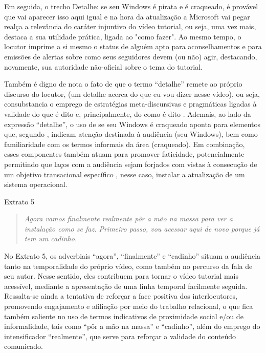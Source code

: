 \documentclass[portuguese]{textolivre}
\begin{document}
Em seguida, o trecho Detalhe: se seu Windows é pirata e é craqueado, é provável que vai aparecer isso aqui igual e na hora da atualização a Microsoft vai pegar realça a relevância do caráter injuntivo do vídeo tutorial, ou seja, uma vez mais, destaca a sua utilidade prática, ligada ao "como fazer". Ao mesmo tempo, o locutor imprime a si mesmo o status de alguém apto para aconselhamentos e para emissões de alertas sobre como seus seguidores devem (ou não) agir, destacando, novamente, sua autoridade não-oficial sobre o tema do tutorial. 

Também é digno de nota o fato de que o termo “detalhe” remete ao próprio discurso do locutor, (um detalhe acerca do que eu vou dizer nesse vídeo), ou seja, consubstancia o emprego de estratégias meta-discursivas e pragmáticas ligadas à validade do que é dito e, principalmente, do como é dito \cite{austin1975}. Ademais, ao lado da expressão “detalhe”, o uso de se seu Windows é craqueado aponta para elementos que, segundo \textcite{hazaparu2015}, indicam atenção destinada à audiência (seu Windows), bem como familiaridade com os termos informais da área (craqueado). Em combinação, esses componentes também atuam para promover faticidade, potencialmente permitindo que laços com a audiência sejam forjados com vistas à consecução de um objetivo transacional específico \cite{spencer2007}, nesse caso, instalar a atualização de um sistema operacional.

\vspace{1ex}
Extrato 5
\begin{quote}
    \textit{Agora vamos finalmente realmente pôr a mão na massa para ver a instalação como se faz. Primeiro passo, vou acessar aqui de novo porque já tem um cadinho.}
\end{quote}



No Extrato 5, os adverbiais “agora”, “finalmente” e “cadinho” situam a audiência tanto na temporalidade do próprio vídeo, como também no percurso da fala de seu autor. Nesse sentido, eles contribuem para tornar o vídeo tutorial mais acessível, mediante a apresentação de uma linha temporal facilmente seguida. Ressalta-se ainda a tentativa de reforçar a face positiva dos interlocutores, promovendo engajamento e afiliação por meio do trabalho relacional, o que fica também saliente no uso de termos indicativos de proximidade social e/ou de informalidade, tais como “pôr a mão na massa” e “cadinho”, além do emprego do intensificador “realmente”, que serve para reforçar a validade do conteúdo comunicado.
\end{document}
